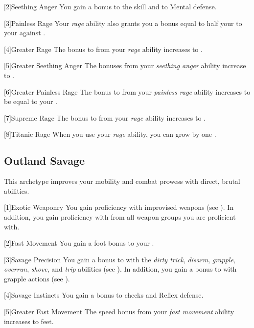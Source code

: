         [2]{Seething Anger}
        You gain a  bonus to the  skill and to Mental defense.

        [3]{Painless Rage} Your \textit{rage} ability also grants you a bonus equal to half your  to your  against .

        [4]{Greater Rage} The bonus to  from your \textit{rage} ability increases to .

        [5]{Greater Seething Anger}
        The bonuses from your \textit{seething anger} ability increase to .

        [6]{Greater Painless Rage} The bonus to  from your \textit{painless rage} ability increases to be equal to your .

        [7]{Supreme Rage} The bonus to  from your \textit{rage} ability increases to .

        [8]{Titanic Rage}
        When you use your \textit{rage} ability, you can grow by one .

    \subsection{Outland Savage}
        This archetype improves your mobility and combat prowess with direct, brutal abilities.

        [1]{Exotic Weaponry} You gain proficiency with improvised weapons (see ).
        In addition, you gain proficiency with  from all weapon groups you are proficient with.

        [2]{Fast Movement} You gain a  foot bonus to your .

        [3]{Savage Precision} You gain a  bonus to  with the \textit{dirty trick}, \textit{disarm}, \textit{grapple}, \textit{overrun}, \textit{shove}, and \textit{trip} abilities (see ).
        In addition, you gain a  bonus to  with grapple actions (see ).

        [4]{Savage Instincts} You gain a  bonus to  checks and Reflex defense.

        [5]{Greater Fast Movement} The speed bonus from your \textit{fast movement} ability increases to  feet.

